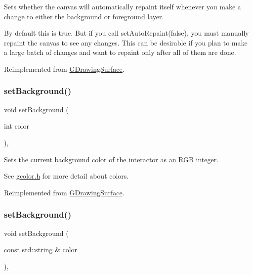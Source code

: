 Sets whether the canvas will automatically repaint itself whenever you make a change to either the background or foreground layer. 

By default this is true. But if you call set\+Auto\+Repaint(false), you must manually repaint the canvas to see any changes. This can be desirable if you plan to make a large batch of changes and want to repaint only after all of them are done. 

Reimplemented from \mbox{\hyperlink{classsgl_1_1GDrawingSurface_adf10848319457bd6df4c657bf8872bee}{G\+Drawing\+Surface}}.

\mbox{\label{classsgl_1_1GCanvas_a10d305826534b55561ea88730fc9f6cd}} 
\subsubsection{\texorpdfstring{set\+Background()}{setBackground()}\hspace{0.1cm}{\footnotesize\ttfamily [1/2]}}
{\footnotesize\ttfamily void set\+Background (\begin{DoxyParamCaption}\item[{int}]{color }\end{DoxyParamCaption})\hspace{0.3cm}{\ttfamily [override]}, {\ttfamily [virtual]}}



Sets the current background color of the interactor as an R\+GB integer. 

See \mbox{\hyperlink{gcolor_8h_source}{gcolor.\+h}} for more detail about colors. 

Reimplemented from \mbox{\hyperlink{classsgl_1_1GDrawingSurface_aba673fd56570a074aba10fa059524b96}{G\+Drawing\+Surface}}.

\mbox{\label{classsgl_1_1GCanvas_a9cb99695b93494c7ba28268ce9e42c2a}} 
\subsubsection{\texorpdfstring{set\+Background()}{setBackground()}\hspace{0.1cm}{\footnotesize\ttfamily [2/2]}}
{\footnotesize\ttfamily void set\+Background (\begin{DoxyParamCaption}\item[{const std\+::string \&}]{color }\end{DoxyParamCaption})\hspace{0.3cm}{\ttfamily [override]}, {\ttfamily [virtual]}}



